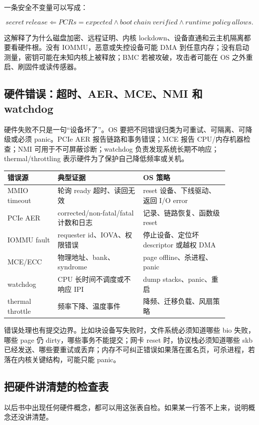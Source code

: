 一条安全不变量可以写成：

\[
secret\ release
\Leftarrow
PCRs=expected \land boot\ chain\ verified
\land runtime\ policy\ allows.
\]

这解释了为什么磁盘加密、远程证明、内核 lockdown、设备直通和云主机隔离都要看硬件根。没有 IOMMU，恶意或失控设备可能 DMA 到任意内存；没有启动测量，密钥可能在未知内核上被释放；BMC 若被攻破，攻击者可能在 OS 之外重启、刷固件或读传感器。

\subsection{硬件错误：超时、AER、MCE、NMI 和 watchdog}

硬件失败不只是一句“设备坏了”。OS 要把不同错误归类为可重试、可隔离、可降级或必须 panic。PCIe AER 报告链路和事务错误；MCE 报告 CPU/内存机器检查；NMI 可用于不可屏蔽诊断；watchdog 负责发现系统长期不响应；thermal/throttling 表示硬件为了保护自己降低频率或关机。

\begin{longtable}{p{0.20\linewidth}p{0.34\linewidth}p{0.34\linewidth}}
\toprule
错误源 & 典型证据 & OS 策略 \\
\midrule
MMIO timeout & 轮询 ready 超时、读回无效 & reset 设备、下线驱动、返回 I/O error \\
PCIe AER & corrected/non-fatal/fatal 计数和日志 & 记录、链路恢复、函数级 reset \\
IOMMU fault & requester id、IOVA、权限错误 & 停止设备、定位坏 descriptor 或越权 DMA \\
MCE/ECC & 物理地址、bank、syndrome & page offline、杀进程、panic \\
watchdog & CPU 长时间不调度或不响应 IPI & dump stacks、panic、重启 \\
thermal throttle & 频率下降、温度事件 & 降频、迁移负载、风扇策略 \\
\bottomrule
\end{longtable}

错误处理也有提交边界。比如块设备写失败时，文件系统必须知道哪些 bio 失败，哪些 page 仍 dirty，哪些事务不能提交；网卡 reset 时，协议栈必须知道哪些 skb 已经发送、哪些要重试或丢弃；内存不可纠正错误如果落在匿名页，可杀进程，若落在内核关键结构，可能只能 panic。

\subsection{把硬件讲清楚的检查表}

以后书中出现任何硬件概念，都可以用这张表自检。如果某一行答不上来，说明概念还没讲清楚。

